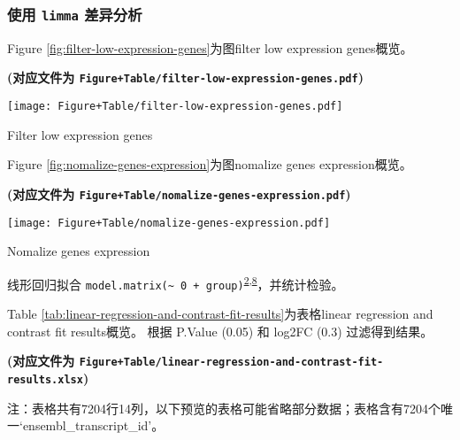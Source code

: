 \documentclass[
]{article}
\begin{document}
\hypertarget{diff}{%
\subsubsection{\texorpdfstring{使用 \texttt{limma} 差异分析}{使用 limma 差异分析}}\label{diff}}

Figure \ref{fig:filter-low-expression-genes}为图filter low expression genes概览。

\textbf{(对应文件为 \texttt{Figure+Table/filter-low-expression-genes.pdf})}

\def\@captype{figure}
\begin{center}
\texttt{[image: Figure+Table/filter-low-expression-genes.pdf]}
\caption{Filter low expression genes}\label{fig:filter-low-expression-genes}
\end{center}

Figure \ref{fig:nomalize-genes-expression}为图nomalize genes expression概览。

\textbf{(对应文件为 \texttt{Figure+Table/nomalize-genes-expression.pdf})}

\def\@captype{figure}
\begin{center}
\texttt{[image: Figure+Table/nomalize-genes-expression.pdf]}
\caption{Nomalize genes expression}\label{fig:nomalize-genes-expression}
\end{center}

线形回归拟合 \texttt{model.matrix(\textasciitilde{}\ 0\ +\ group)}\textsuperscript{\protect\hyperlink{ref-LimmaPowersDiRitchi2015}{2},\protect\hyperlink{ref-AGuideToCreaLawC2020}{8}}，并统计检验。

Table \ref{tab:linear-regression-and-contrast-fit-results}为表格linear regression and contrast fit results概览。
根据 P.Value (0.05) 和 \textbar log2FC\textbar{} (0.3) 过滤得到结果。

\textbf{(对应文件为 \texttt{Figure+Table/linear-regression-and-contrast-fit-results.xlsx})}

\begin{center}\begin{tcolorbox}[colback=gray!10, colframe=gray!50, width=0.9\linewidth, arc=1mm, boxrule=0.5pt]注：表格共有7204行14列，以下预览的表格可能省略部分数据；表格含有7204个唯一`ensembl\_transcript\_id'。
\end{tcolorbox}
\end{center}
\end{document}
